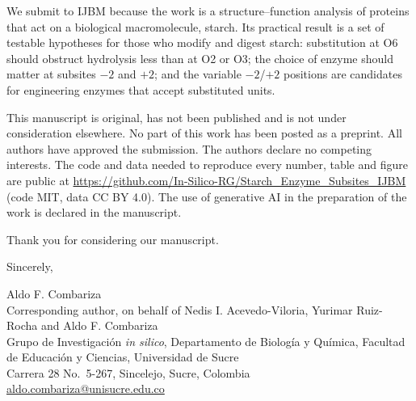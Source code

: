 \documentclass[11pt]{article}
\begin{document}
We submit to IJBM because the work is a structure--function analysis of proteins that act on a
biological macromolecule, starch. Its practical result is a set of testable hypotheses for those who modify and
digest starch: substitution at O6 should obstruct hydrolysis less than at O2 or O3; the choice of enzyme should
matter at subsites $-2$ and $+2$; and the variable $-2$/$+2$ positions are candidates for engineering enzymes that
accept substituted units.

This manuscript is original, has not been published and is not under consideration elsewhere. No part of this work has been posted as a preprint. All
authors have approved the submission. The authors declare no competing interests. The code and data
needed to reproduce every number, table and figure are public at
\url{https://github.com/In-Silico-RG/Starch_Enzyme_Subsites_IJBM} (code MIT, data CC BY 4.0). The use of generative AI in the
preparation of the work is declared in the manuscript.

Thank you for considering our manuscript.

Sincerely,

\vspace{1.2em}
Aldo F. Combariza \\
Corresponding author, on behalf of Nedis I. Acevedo-Viloria, Yurimar Ruiz-Rocha and Aldo F. Combariza \\
Grupo de Investigaci\'on \textit{in silico}, Departamento de Biolog\'ia y Qu\'imica, Facultad de Educaci\'{o}n y Ciencias, Universidad de Sucre \\
Carrera 28 No.\ 5-267, Sincelejo, Sucre, Colombia \\
\href{mailto:aldo.combariza@unisucre.edu.co}{aldo.combariza@unisucre.edu.co}
\end{document}
